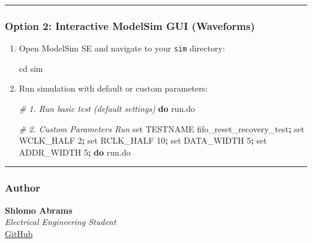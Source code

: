 \documentclass[
]{article}
\newenvironment{Shaded}{}{}
\newcommand{\BuiltInTok}[1]{\textcolor[rgb]{0.00,0.50,0.00}{#1}}
\newcommand{\CommentTok}[1]{\textcolor[rgb]{0.38,0.63,0.69}{\textit{#1}}}
\newcommand{\ControlFlowTok}[1]{\textcolor[rgb]{0.00,0.44,0.13}{\textbf{#1}}}
\newcommand{\ExtensionTok}[1]{#1}
\newcommand{\KeywordTok}[1]{\textcolor[rgb]{0.00,0.44,0.13}{\textbf{#1}}}
\newcommand{\NormalTok}[1]{#1}
\providecommand{\tightlist}{%
  \setlength{\itemsep}{0pt}\setlength{\parskip}{0pt}}
\begin{document}
\begin{center}\rule{0.5\linewidth}{0.5pt}\end{center}

\subsubsection{Option 2: Interactive ModelSim GUI
(Waveforms)}\label{option-2-interactive-modelsim-gui-waveforms}

\begin{enumerate}
\def\labelenumi{\arabic{enumi}.}
\tightlist
\item
  Open ModelSim SE and navigate to your \texttt{sim} directory:

\begin{Shaded}
\begin{Highlighting}[]
\BuiltInTok{cd}\NormalTok{ sim}
\end{Highlighting}
\end{Shaded}
\item
  Run simulation with default or custom parameters:

\begin{Shaded}
\begin{Highlighting}[]
\CommentTok{\# 1. Run basic test (default settings)}
\ControlFlowTok{do} \ExtensionTok{run.do}

\CommentTok{\# 2. Custom Parameters Run}
\BuiltInTok{set}\NormalTok{ TESTNAME fifo\_reset\_recovery\_test}\KeywordTok{;} \BuiltInTok{set}\NormalTok{ WCLK\_HALF 2}\KeywordTok{;} \BuiltInTok{set}\NormalTok{ RCLK\_HALF 10}\KeywordTok{;} \BuiltInTok{set}\NormalTok{ DATA\_WIDTH 5}\KeywordTok{;} \BuiltInTok{set}\NormalTok{ ADDR\_WIDTH 5}\KeywordTok{;} \ControlFlowTok{do} \ExtensionTok{run.do}
\end{Highlighting}
\end{Shaded}
\end{enumerate}

\begin{center}\rule{0.5\linewidth}{0.5pt}\end{center}

\subsubsection{Author}\label{author}

\textbf{Shlomo Abrams}\\
\emph{Electrical Engineering Student}\\
\href{https://github.com/ShlomoAbrams}{GitHub}
\end{document}
